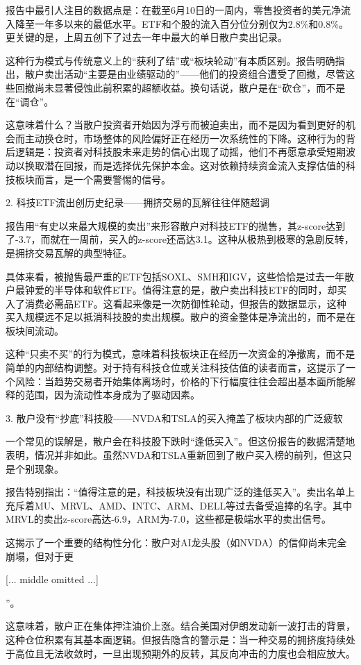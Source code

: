 \documentclass[11pt]{ctexart}
\begin{document}
报告中最引人注目的数据点是：在截至6月10日的一周内，零售投资者的美元净流入降至一年多以来的最低水平。ETF和个股的流入百分位分别仅为2.8\%和0.8\%。更关键的是，上周五创下了过去一年中最大的单日散户卖出记录。

这种行为模式与传统意义上的“获利了结”或“板块轮动”有本质区别。报告明确指出，散户卖出活动“主要是由业绩驱动的”——他们的投资组合遭受了回撤，尽管这些回撤尚未显著侵蚀此前积累的超额收益。换句话说，散户是在“砍仓”，而不是在“调仓”。

这意味着什么？当散户投资者开始因为浮亏而被迫卖出，而不是因为看到更好的机会而主动换仓时，市场整体的风险偏好正在经历一次系统性的下降。这种行为的背后逻辑是：投资者对科技股未来走势的信心出现了动摇，他们不再愿意承受短期波动以换取潜在回报，而是选择优先保护本金。这对依赖持续资金流入支撑估值的科技板块而言，是一个需要警惕的信号。

2. 科技ETF流出创历史纪录——拥挤交易的瓦解往往伴随超调

报告用“有史以来最大规模的卖出”来形容散户对科技ETF的抛售，其z-score达到了-3.7，而就在一周前，买入的z-score还高达3.1。这种从极热到极寒的急剧反转，是拥挤交易瓦解的典型特征。

具体来看，被抛售最严重的ETF包括SOXL、SMH和IGV，这些恰恰是过去一年散户最钟爱的半导体和软件ETF。值得注意的是，散户卖出科技ETF的同时，却买入了消费必需品ETF。这看起来像是一次防御性轮动，但报告的数据显示，这种买入规模远不足以抵消科技股的卖出规模。散户的资金整体是净流出的，而不是在板块间流动。

这种“只卖不买”的行为模式，意味着科技板块正在经历一次资金的净撤离，而不是简单的内部结构调整。对于持有科技仓位或关注科技估值的读者而言，这提示了一个风险：当趋势交易者开始集体离场时，价格的下行幅度往往会超出基本面所能解释的范围，因为流动性本身成为了驱动因素。

3. 散户没有“抄底”科技股——NVDA和TSLA的买入掩盖了板块内部的广泛疲软

一个常见的误解是，散户会在科技股下跌时“逢低买入”。但这份报告的数据清楚地表明，情况并非如此。虽然NVDA和TSLA重新回到了散户买入榜的前列，但这只是个别现象。

报告特别指出：“值得注意的是，科技板块没有出现广泛的逢低买入”。卖出名单上充斥着MU、MRVL、AMD、INTC、ARM、DELL等过去备受追捧的名字。其中MRVL的卖出z-score高达-6.9，ARM为-7.0，这些都是极端水平的卖出信号。

这揭示了一个重要的结构性分化：散户对AI龙头股（如NVDA）的信仰尚未完全崩塌，但对于更

[... middle omitted ...]

”。

这意味着，散户正在集体押注油价上涨。结合美国对伊朗发动新一波打击的背景，这种仓位积累有其基本面逻辑。但报告隐含的警示是：当一种交易的拥挤度持续处于高位且无法收敛时，一旦出现预期外的反转，其反向冲击的力度也会相应放大。
\end{document}
